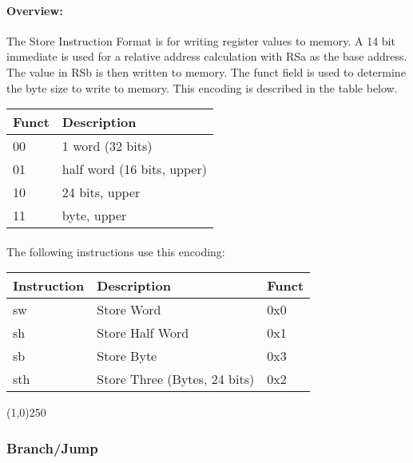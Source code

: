 \documentclass[letterpaper, 11pt]{article}
\begin{document}
\paragraph{Overview:}The Store Instruction Format is for writing register values to memory. A 14 bit immediate is used
for a relative address calculation with RSa as the base address. The value in RSb is then written to memory. The funct field is used
to determine the byte size to write to memory. This encoding is described in the table below. \\
	\begin{tabular}{l|l}
		Funct & Description \\ \hline
		00	  & 1 word (32 bits) \\
		01	  & half word (16 bits, upper) \\ 
		10	  & 24 bits, upper \\
		11	  & byte, upper		\\
	\end{tabular}
\paragraph{}The following instructions use this encoding: \\

	\begin{center}
		\begin{tabular}{|l|l|l|} \hline
			Instruction & Description 						& Funct\\ \hline
			sw			& Store Word							& 0x0 \\ \hline
			sh			& Store Half Word					& 0x1 \\ \hline
			sb			& Store Byte							& 0x3 \\ \hline
			sth			& Store Three (Bytes, 24 bits)		& 0x2 \\ \hline

		\end{tabular}
	\end{center}

\begin{center}
	\line(1,0){250}
\end{center}

\newpage
\subsubsection{Branch/Jump}
\end{document}
